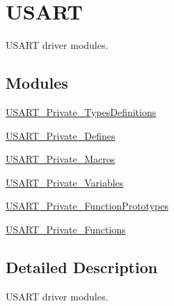 \hypertarget{group___u_s_a_r_t}{\section{U\-S\-A\-R\-T}
\label{group___u_s_a_r_t}
}


U\-S\-A\-R\-T driver modules.  


\subsection*{Modules}
\begin{DoxyCompactItemize}
\item 
\hyperlink{group___u_s_a_r_t___private___types_definitions}{U\-S\-A\-R\-T\-\_\-\-Private\-\_\-\-Types\-Definitions}
\item 
\hyperlink{group___u_s_a_r_t___private___defines}{U\-S\-A\-R\-T\-\_\-\-Private\-\_\-\-Defines}
\item 
\hyperlink{group___u_s_a_r_t___private___macros}{U\-S\-A\-R\-T\-\_\-\-Private\-\_\-\-Macros}
\item 
\hyperlink{group___u_s_a_r_t___private___variables}{U\-S\-A\-R\-T\-\_\-\-Private\-\_\-\-Variables}
\item 
\hyperlink{group___u_s_a_r_t___private___function_prototypes}{U\-S\-A\-R\-T\-\_\-\-Private\-\_\-\-Function\-Prototypes}
\item 
\hyperlink{group___u_s_a_r_t___private___functions}{U\-S\-A\-R\-T\-\_\-\-Private\-\_\-\-Functions}
\end{DoxyCompactItemize}


\subsection{Detailed Description}
U\-S\-A\-R\-T driver modules. 